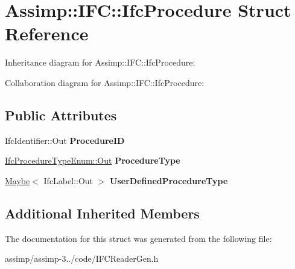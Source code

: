 \hypertarget{struct_assimp_1_1_i_f_c_1_1_ifc_procedure}{\section{Assimp\+:\+:I\+F\+C\+:\+:Ifc\+Procedure Struct Reference}
\label{struct_assimp_1_1_i_f_c_1_1_ifc_procedure}
}


Inheritance diagram for Assimp\+:\+:I\+F\+C\+:\+:Ifc\+Procedure\+:


Collaboration diagram for Assimp\+:\+:I\+F\+C\+:\+:Ifc\+Procedure\+:
\subsection*{Public Attributes}
\begin{DoxyCompactItemize}
\item 
\hypertarget{struct_assimp_1_1_i_f_c_1_1_ifc_procedure_a762d559f8afe3d6034a68c6734a606db}{Ifc\+Identifier\+::\+Out {\bfseries Procedure\+I\+D}}\label{struct_assimp_1_1_i_f_c_1_1_ifc_procedure_a762d559f8afe3d6034a68c6734a606db}

\item 
\hypertarget{struct_assimp_1_1_i_f_c_1_1_ifc_procedure_a0528d3fc146daedf640b293369561eec}{\hyperlink{classboost_1_1shared__ptr}{Ifc\+Procedure\+Type\+Enum\+::\+Out} {\bfseries Procedure\+Type}}\label{struct_assimp_1_1_i_f_c_1_1_ifc_procedure_a0528d3fc146daedf640b293369561eec}

\item 
\hypertarget{struct_assimp_1_1_i_f_c_1_1_ifc_procedure_a61b3f490ba0aa4dc6171ddc31859914a}{\hyperlink{struct_assimp_1_1_s_t_e_p_1_1_maybe}{Maybe}$<$ Ifc\+Label\+::\+Out $>$ {\bfseries User\+Defined\+Procedure\+Type}}\label{struct_assimp_1_1_i_f_c_1_1_ifc_procedure_a61b3f490ba0aa4dc6171ddc31859914a}

\end{DoxyCompactItemize}
\subsection*{Additional Inherited Members}


The documentation for this struct was generated from the following file\+:\begin{DoxyCompactItemize}
\item 
assimp/assimp-\/3../code/I\+F\+C\+Reader\+Gen.\+h\end{DoxyCompactItemize}
